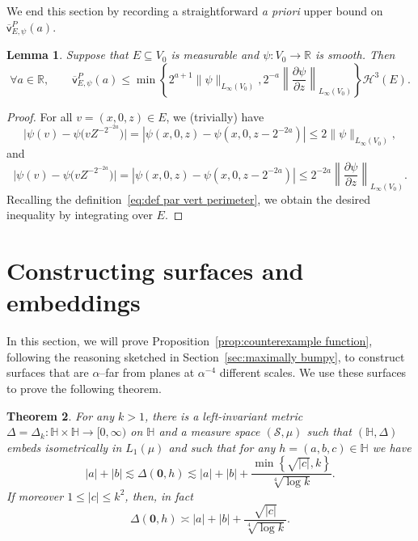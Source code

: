 \documentclass[11pt,reqno]{amsart}
\renewcommand{\H}{\mathbb{H}}
\newcommand{\R}{\mathbb{R}}
\newcommand{\cH}{\mathcal{H}}
\newcommand{\VV}{\mathsf{V}}
\newcommand{\0}{\mathbf{0}}
\renewcommand{\1}{\mathbf 1}
\newcommand{\from}{\colon}
\renewcommand{\subset}{\subseteq}
\renewcommand{\le}{\leqslant}
\newtheorem{thm}{Theorem}[section]
\newtheorem{lemma}[thm]{Lemma}
\theoremstyle{remark}
\newcommand{\vpP}[1]{{\overline{\mathsf{v}}^{P}_{\!#1}}}
\DeclareMathOperator{\Per}{Per}
\newcommand{\pd}[2]{\frac{\partial #2}{\partial #1}}
\begin{document}
We end this section by recording  a straightforward \emph{a priori} upper bound on $\vpP{E,\psi}(a)$.




\begin{lemma}\label{lem:vpP exp decay} Suppose that $E\subset V_0$ is measurable and $\psi\from V_0\to \R$ is smooth. Then
  $$\forall  a\in \R,\qquad \vpP{E, \psi}(a)\le \min \left\{ 2^{a+1} \|\psi\|_{L_\infty(V_0)}, 2^{-a} \left\|\pd{z}{\psi}\right\|_{L_\infty(V_0)}\right\}\cH^3(E).$$
\end{lemma}
\begin{proof}
  For all $v=(x,0,z)\in E$, we (trivially) have
  $$
 \big|\psi(v)-\psi\big(v Z^{-2^{-2a}}\big)\big|= |\psi(x,0,z)-\psi(x,0,z-2^{-2a})|\le 2\|\psi\|_{L_\infty(V_0)},
  $$
  and
  $$\big|\psi(v)-\psi\big(v Z^{-2^{-2a}}\big)\big|= |\psi(x,0,z)-\psi(x,0,z-2^{-2a})|\le 2^{-2a} \left\|\pd{z}{\psi}\right\|_{L_\infty(V_0)}.$$
  Recalling the definition~\eqref{eq:def par vert perimeter}, we obtain the desired inequality by integrating over $E$.
\end{proof}







\section{Constructing surfaces and embeddings} \label{sec:counterexampleConstruction}

In this section, we will prove Proposition~\ref{prop:counterexample function}, following the reasoning sketched in Section~\ref{sec:maximally bumpy}, to construct surfaces that are $\alpha$--far from planes at $\alpha^{-4}$ different scales.  We use these surfaces to prove the following theorem.
\begin{thm}\label{thm:counterexample embedding}
  For any $k>1$, there is a left-invariant metric $\Delta=\Delta_k\from \H\times \H\to [0,\infty)$ on $\H$ and a measure space $(\mathscr{S},\mu)$ such that $(\H,\Delta)$ embeds isometrically in $L_1(\mu)$ and such that for any $h=(a,b,c)\in \H$ we have
 \begin{equation}\label{eq:for all h}|a|+|b|\lesssim \Delta(\mathbf{0},h)\lesssim |a|+|b|+\frac{\min\left\{\sqrt{|c|},k\right\}}{\sqrt[4]{\log k}}.\end{equation}
If moreover $1\le |c|\le k^2$, then, in fact
\begin{equation}\label{eq:with restriction on c}
\Delta(\mathbf{0},h)\asymp |a|+|b|+\frac{\sqrt{|c|}}{\sqrt[4]{\log k}}.
\end{equation}
\end{thm}
\end{document}
